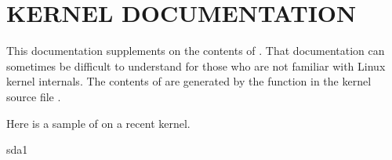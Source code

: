 \documentclass[letterpaper,10pt,english]{sphinxmanual}
\begin{document}
\section{KERNEL DOCUMENTATION}
\label{\detokenize{mariadb-iostat:kernel-documentation}}
\sphinxAtStartPar
This documentation supplements  on the
contents of .  That documentation can sometimes be difficult
to understand for those who are not familiar with Linux kernel internals.  The
contents of  are generated by the  function
in the kernel source file .

\sphinxAtStartPar
Here is a sample of  on a recent kernel.

\begin{sphinxVerbatim}[commandchars=\\\{\}]
  sda1           
\end{sphinxVerbatim}
\end{document}
